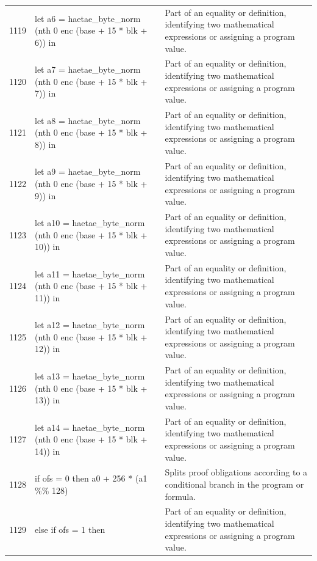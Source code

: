 \documentclass[10pt]{article}
\begin{document}
\begin{longtable}{r L{0.53\textwidth} L{0.37\textwidth}}
1119 & {\ttfamily\scriptsize   let a6 = haetae\_byte\_norm (nth 0 enc (base + 15 * blk + 6)) in} & Part of an equality or definition, identifying two mathematical expressions or assigning a program value. \\
1120 & {\ttfamily\scriptsize   let a7 = haetae\_byte\_norm (nth 0 enc (base + 15 * blk + 7)) in} & Part of an equality or definition, identifying two mathematical expressions or assigning a program value. \\
1121 & {\ttfamily\scriptsize   let a8 = haetae\_byte\_norm (nth 0 enc (base + 15 * blk + 8)) in} & Part of an equality or definition, identifying two mathematical expressions or assigning a program value. \\
1122 & {\ttfamily\scriptsize   let a9 = haetae\_byte\_norm (nth 0 enc (base + 15 * blk + 9)) in} & Part of an equality or definition, identifying two mathematical expressions or assigning a program value. \\
1123 & {\ttfamily\scriptsize   let a10 = haetae\_byte\_norm (nth 0 enc (base + 15 * blk + 10)) in} & Part of an equality or definition, identifying two mathematical expressions or assigning a program value. \\
1124 & {\ttfamily\scriptsize   let a11 = haetae\_byte\_norm (nth 0 enc (base + 15 * blk + 11)) in} & Part of an equality or definition, identifying two mathematical expressions or assigning a program value. \\
1125 & {\ttfamily\scriptsize   let a12 = haetae\_byte\_norm (nth 0 enc (base + 15 * blk + 12)) in} & Part of an equality or definition, identifying two mathematical expressions or assigning a program value. \\
1126 & {\ttfamily\scriptsize   let a13 = haetae\_byte\_norm (nth 0 enc (base + 15 * blk + 13)) in} & Part of an equality or definition, identifying two mathematical expressions or assigning a program value. \\
1127 & {\ttfamily\scriptsize   let a14 = haetae\_byte\_norm (nth 0 enc (base + 15 * blk + 14)) in} & Part of an equality or definition, identifying two mathematical expressions or assigning a program value. \\
1128 & {\ttfamily\scriptsize   if ofs = 0 then a0 + 256 * (a1 \%\% 128)} & Splits proof obligations according to a conditional branch in the program or formula. \\
1129 & {\ttfamily\scriptsize   else if ofs = 1 then} & Part of an equality or definition, identifying two mathematical expressions or assigning a program value. \\

\end{longtable}
\end{document}
